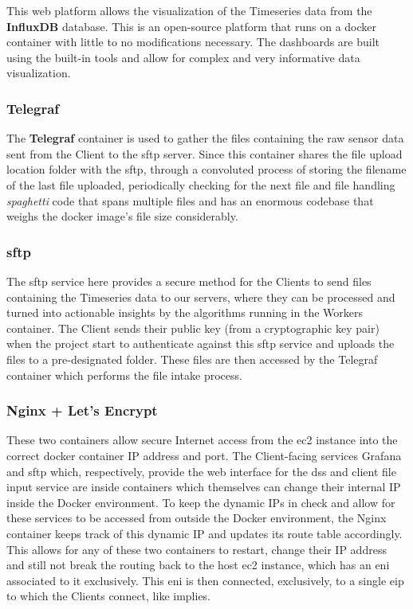 This web platform allows the visualization of the Timeseries data from the \textbf{InfluxDB} database. This is an open-source platform that runs on a docker container with little to no modifications necessary. The dashboards are built using the built-in tools and allow for complex and very informative data visualization. 

\subsubsection{Telegraf}\label{methodology:sss:telegraf}

The \textbf{Telegraf} container is used to gather the files containing the raw sensor data sent from the Client to the \gls{sftp} server. Since this container shares the file upload location folder with the \gls{sftp}, through a convoluted process of storing the filename of the last file uploaded, periodically checking for the next file and file handling \textit{spaghetti} code that spans multiple files and has an enormous codebase that weighs the docker image's file size considerably. 

\subsubsection{\gls{sftp}}\label{methodology:sss:sftp}

The \gls{sftp} service here provides a secure method for the Clients to send files containing the Timeseries data to our servers, where they can be processed and turned into actionable insights by the algorithms running in the Workers container. The Client sends their public key (from a cryptographic key pair) when the project start to authenticate against this \gls{sftp} service and uploads the files to a pre-designated folder. These files are then accessed by the Telegraf container which performs the file intake process.


\subsubsection{Nginx + Let's Encrypt}\label{methodology:sss:nginxletsencrypt}

These two containers allow secure Internet access from the \gls{ec2} instance into the correct docker container IP address and port. The Client-facing services Grafana and \gls{sftp} which, respectively, provide the web interface for the \gls{dss} and client file input service are inside containers which themselves can change their internal IP inside the Docker environment. To keep the dynamic IPs in check and allow for these services to be accessed from outside the Docker environment, the Nginx container keeps track of this dynamic IP and updates its route table accordingly. This allows for any of these two containers to restart, change their IP address and still not break the routing back to the host \gls{ec2} instance, which has an \gls{eni} associated to it exclusively. This \gls{eni} is then connected, exclusively, to a single \gls{eip} to which the Clients connect, like  implies.


